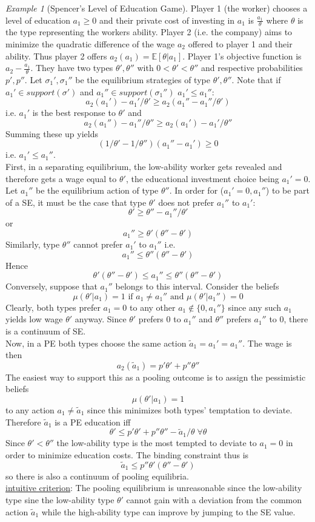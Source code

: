 \documentclass[a4paper, 12pt]{article}
\theoremstyle{plain}
\theoremstyle{definition}
\theoremstyle{lemma}
\theoremstyle{remark}
\theoremstyle{corollary}
\theoremstyle{example}
\newtheorem{example}[theorem]{Example}
\begin{document}
	\begin{example}[Spencer's Level of Education Game]
		Player 1 (the worker) chooses a level of education $a_1 \geq 0$ and their private cost of investing in $a_1$ is $\frac{a_1}{\theta}$ where $\theta$ is the type representing the workers ability. Player 2 (i.e. the company) aims to minimize the quadratic difference of the wage $a_2$ offered to player 1 and their ability. Thus player 2 offers $a_2(a_1) = \mathbb{E}[\theta | a_1]$. Player 1's objective function is $a_2 - \frac{a_1}{\theta}$. They have two types $\theta', \theta''$ with $0<\theta' < \theta''$ and respective probabilities $p',p''$. Let $\sigma_1', \sigma_1''$ be the equilibrium strategies of type $\theta', \theta''$. Note that if $a_1' \in support(\sigma')$ and $a_1'' \in support(\sigma_1'')$ $a_1' \leq a_1''$: \[a_2(a_1') - a_1'/\theta' \geq a_2(a_1'' - a_1''/\theta')\] i.e. $a_1'$ is the best response to $\theta'$ and \[a_2(a_1'') - a_1''/\theta'' \geq a_2(a_1') - a_1'/\theta''\] Summing these up yields \[(1/\theta' - 1/\theta'')(a_1'' - a_1') \geq 0\] i.e. $a_1' \leq a_1''$.\\
		First, in a separating equilibrium, the low-ability worker gets revealed and therefore gets a wage equal to $\theta'$, the educational investment choice being $a_1' = 0$.\\
		Let $a_1''$ be the equilibrium action of type $\theta''$. In order for ($a_1' = 0, a_1''$) to be part of a SE, it must be the case that type $\theta'$ does not prefer $a_1''$ to $a_1'$: \[\theta' \geq \theta'' - a_1''/\theta'\]
		or \[a_1'' \geq \theta'(\theta''-\theta')\]
		Similarly, type $\theta''$ cannot prefer $a_1'$ to $a_1''$ i.e. \[a_1'' \leq \theta''(\theta'' - \theta')\] Hence \[\theta'(\theta'' - \theta') \leq a_1'' \leq \theta''(\theta''-\theta')\]
		Conversely, suppose that $a_1''$ belongs to this interval. Consider the beliefs \[\mu(\theta'| a_1) = 1 \text{ if } a_1 \neq a_1'' \text{ and } \mu(\theta'|a_1'') = 0\]
		Clearly, both types prefer $a_1 = 0$ to any other $a_1 \notin \{0,a_1''\}$ since any such $a_1$ yields low wage $\theta'$ anyway. Since $\theta'$ prefers 0 to $a_1''$ and $\theta''$ prefers $a_1''$ to 0, there is a continuum of SE.\\
		Now, in a PE both types choose the same action $\tilde{a}_1 = a_1' = a_1''$. The wage is then \[a_2(\tilde{a}_1) = p'\theta' + p''\theta''\] The easiest way to support this as a pooling outcome is to assign the pessimistic beliefs \[\mu(\theta'|a_1) = 1\] to any action $a_1 \neq \tilde{a}_1$ since this minimizes both types' temptation to deviate. Therefore $\tilde{a}_1$ is a PE education iff \[\theta' \leq p'\theta' + p''\theta'' - \tilde{a}_1/\theta \; \forall \theta\]
		Since $\theta' < \theta''$ the low-ability type is the most tempted to deviate to $a_1 = 0$ in order to minimize education costs. The binding constraint thus is \[\tilde{a}_1 \leq p''\theta'(\theta''-\theta')\] so there is also a continuum of pooling equilibria.\\
		\underline{intuitive criterion}: The pooling equilibrium is unreasonable since the low-ability type sine the low-ability type $\theta'$ cannot gain with a deviation from the common action $\tilde{a}_1$ while the high-ability type can improve by jumping to the SE value.
	\end{example}
\end{document}
